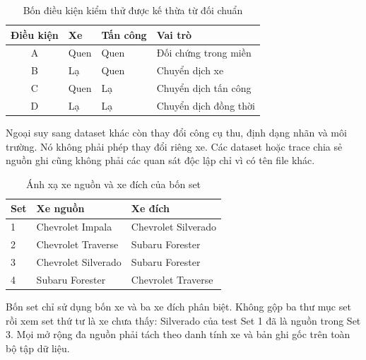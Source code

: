 \documentclass[12pt,a4paper,oneside,openany]{extbook}
\begin{document}
\begin{table}[htbp]\centering
\caption{Bốn điều kiện kiểm thử được kế thừa từ đối chuẩn}\label{tab:conditions}
\begin{tabular}{clll}\toprule Điều kiện & Xe & Tấn công & Vai trò\\\midrule
A & Quen & Quen & Đối chứng trong miền\\
B & Lạ & Quen & Chuyển dịch xe\\
C & Quen & Lạ & Chuyển dịch tấn công\\
D & Lạ & Lạ & Chuyển dịch đồng thời\\\bottomrule\end{tabular}
\end{table}

Ngoại suy sang dataset khác còn thay đổi công cụ thu, định dạng nhãn và môi trường. Nó không phải phép thay đổi riêng xe. Các dataset hoặc trace chia sẻ nguồn ghi cũng không phải các quan sát độc lập chỉ vì có tên file khác.

\begin{table}[htbp]\centering
\caption{Ánh xạ xe nguồn và xe đích của bốn set}\label{tab:vehicle_pairs}
\begin{tabular}{lll}\toprule Set & Xe nguồn & Xe đích\\\midrule
1 & Chevrolet Impala & Chevrolet Silverado\\
2 & Chevrolet Traverse & Subaru Forester\\
3 & Chevrolet Silverado & Subaru Forester\\
4 & Subaru Forester & Chevrolet Traverse\\\bottomrule\end{tabular}
\end{table}

Bốn set chỉ sử dụng bốn xe và ba xe đích phân biệt. Không gộp ba thư mục set rồi xem set thứ tư là xe chưa thấy: Silverado của test Set 1 đã là nguồn trong Set 3. Mọi mở rộng đa nguồn phải tách theo danh tính xe và bản ghi gốc trên toàn bộ tập dữ liệu.

\clearpage
\end{document}
